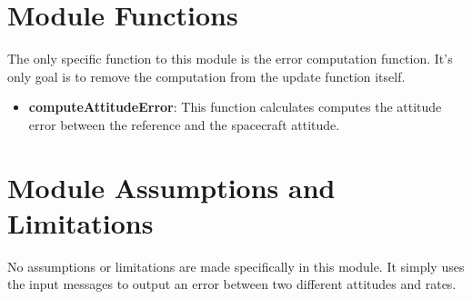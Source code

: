 

\section{Module Functions}

The only specific function to this module is the error computation function. It's only goal is to remove the computation from the update function itself.
\begin{itemize}
	\item \textbf{computeAttitudeError}: This function calculates computes the attitude error between the reference and the spacecraft attitude.
\end{itemize}

\section{Module Assumptions and Limitations}

No assumptions or limitations are made specifically in this module. It simply uses the input messages to output an error between two different attitudes and rates. 